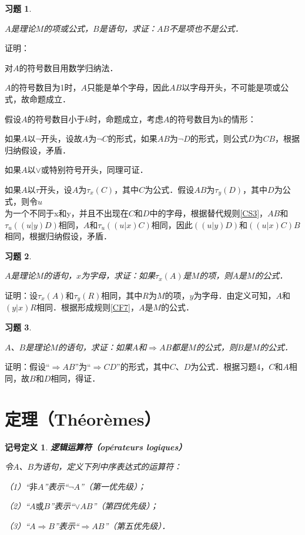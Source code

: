 \documentclass[12pt, a4paper, oneside]{book}
\newtheorem{sign}{记号定义}
\newtheorem{exer}{习题}
\begin{document}
			\begin{exer}\label{exer4}
				\hfill\par
				$A$是理论$M$的项或公式，$B$是语句，求证：$AB$不是项也不是公式．
			\end{exer}
			证明：
			\par
			对$A$的符号数目用数学归纳法．
			\par
			$A$的符号数目为1时，$A$只能是单个字母，因此$AB$以字母开头，不可能是项或公式，故命题成立．
			\par
			假设$A$的符号数目小于$k$时，命题成立，考虑$A$的符号数目为k的情形：
			\par
			如果$A$以$\neg$开头，设故$A$为$\neg C$的形式，如果$AB$为$\neg D$的形式，则公式$D$为$CB$，根据归纳假设，矛盾．
			\par
			如果$A$以$\lor$或特别符号开头，同理可证．
			\par
			如果$A$以$\tau$开头，设$A$为$\tau_x(C)$，其中$C$为公式．假设$AB$为$\tau_y(D)$，其中$D$为公式，则令$u$\\为一个不同于x和y，并且不出现在$C$和$D$中的字母，根据替代规则\ref{CS3}，$AB$和$\tau_u((u|y)D)$相同，$A$和$\tau_u((u|x)C)$相同，因此$((u|y)D)$和$((u|x)C)B$相同，根据归纳假设，矛盾．

			\begin{exer}\label{exer5}
				\hfill\par
				$A$是理论$M$的语句，$x$为字母，求证：如果$\tau_x(A)$是$M$的项，则$A$是$M$的公式．
			\end{exer}
			证明：设$\tau_x(A)$和$\tau_y(R)$相同，其中$R$为$M$的项，$y$为字母．由定义可知，$A$和$(y|x)R$相同．根据形成规则\ref{CF7}，$A$是$M$的公式．

			\begin{exer}\label{exer6}
				\hfill\par
				$A$、$B$是理论$M$的语句，求证：如果$A$和$\Rightarrow AB$都是$M$的公式，则$B$是$M$的公式．
			\end{exer}
			证明：假设“$\Rightarrow AB$”为“$\Rightarrow CD$”的形式，其中$C$、$D$为公式．根据习题4，$C$和$A$相同，故$B$和$D$相同，得证．
		
		\section{定理（Théorèmes）}
			\begin{sign}
				\textbf{逻辑运算符（opérateurs logiques）}
				\par
				令$A$、$B$为语句，定义下列中序表达式的运算符：
				\par
				（1）“$\text{非}A$”表示“$\neg A$”（第一优先级）；
				\par
				（2）“$A\text{或}B$”表示“$\lor AB$”（第四优先级）；
				\par
				（3）“$A\Rightarrow B$”表示“$\Rightarrow AB$”（第五优先级）．
			\end{sign}
		
\end{document}

